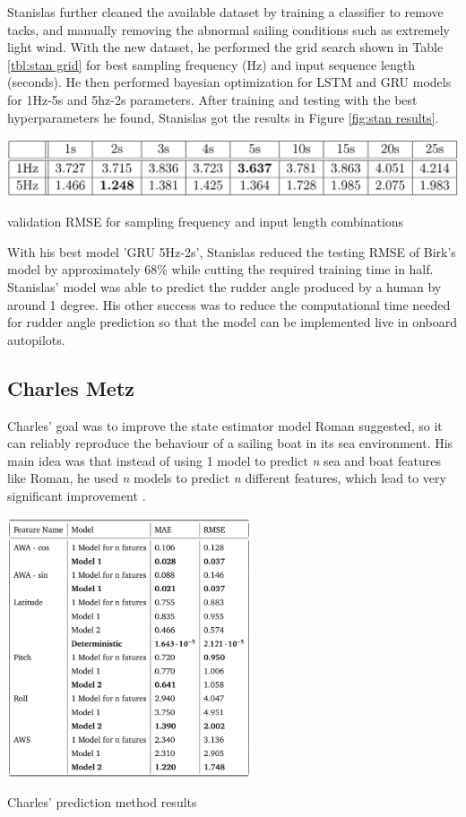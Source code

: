 \documentclass[12pt,twoside]{report}
\begin{document}
Stanislas further cleaned the available dataset by training a classifier to remove tacks, and manually removing the abnormal sailing conditions such as extremely light wind. With the new dataset, he performed the grid search shown in Table \ref{tbl:stan grid} for best sampling frequency (Hz) and input sequence length (seconds). He then performed bayesian optimization for LSTM and GRU models for 1Hz-5s and 5hz-2s parameters. After training and testing with the best hyperparameters he found, Stanislas got the results in Figure \ref{fig:stan results}.

\begin{table}[h]
\centering
\includegraphics[width=\linewidth]{figures/stan grid search.png}
\caption{validation RMSE for sampling frequency and input length combinations}
\label{tbl:stan grid}
\end{table}

With his best model 'GRU 5Hz-2s', Stanislas reduced the testing RMSE of Birk's model by approximately 68\% while cutting the required training time in half. Stanislas' model was able to predict the rudder angle produced by a human by around 1 degree. His other success was to reduce the computational time needed for rudder angle prediction so that the model can be implemented live in onboard autopilots.

\subsection{Charles Metz}
Charles' goal was to improve the state estimator model Roman suggested, so it can reliably reproduce the behaviour of a sailing boat in its sea environment. His main idea was that instead of using 1 model to predict \emph{n} sea and boat features like Roman, he used \emph{n} models to predict \emph{n} different features, which lead to very significant improvement \cite{charles}.

\begin{table}
\centering
\includegraphics[width=0.54\textwidth]{figures/charles results.png}
\caption{Charles' prediction method results}
\label{tbl:charles results}
\end{table}
\end{document}

